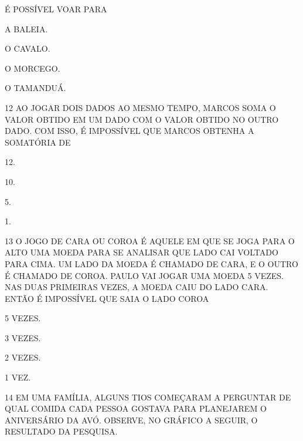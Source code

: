 É POSSÍVEL VOAR PARA

\begin{escolha}[itemsep=0pt]
\item A BALEIA.

\item O CAVALO.

\item O MORCEGO.

\item O TAMANDUÁ.
\end{escolha}

\num{12} AO JOGAR DOIS DADOS AO MESMO TEMPO, MARCOS SOMA O VALOR OBTIDO EM UM DADO COM O VALOR OBTIDO NO OUTRO DADO.
COM ISSO, É IMPOSSÍVEL QUE MARCOS OBTENHA A SOMATÓRIA DE

\begin{multicols}{4}
\begin{escolha}[itemsep=0pt]
\item 12.

\item 10.

\item 5.

\item 1.
\end{escolha}
\end{multicols}

\num{13} O JOGO DE CARA OU COROA É AQUELE EM QUE SE JOGA PARA O ALTO UMA MOEDA
PARA SE ANALISAR QUE LADO CAI VOLTADO PARA CIMA. UM LADO DA MOEDA É CHAMADO DE
CARA, E O OUTRO É CHAMADO DE COROA. PAULO VAI JOGAR UMA MOEDA 5 VEZES. NAS DUAS
PRIMEIRAS VEZES, A MOEDA CAIU DO LADO CARA. ENTÃO É IMPOSSÍVEL QUE SAIA O LADO
COROA

\begin{escolha}[itemsep=0pt]
\item 5 VEZES.

\item 3 VEZES.

\item 2 VEZES.

\item 1 VEZ.
\end{escolha}

\num{14} EM UMA FAMÍLIA, ALGUNS TIOS COMEÇARAM A PERGUNTAR DE QUAL COMIDA CADA
PESSOA GOSTAVA PARA PLANEJAREM O ANIVERSÁRIO DA AVÓ. OBSERVE, NO GRÁFICO A SEGUIR,
O RESULTADO DA PESQUISA.

